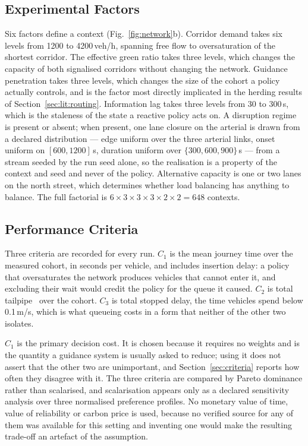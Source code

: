 \subsection{Experimental Factors}
\label{sec:method:fac}

Six factors define a context (Fig.~\ref{fig:network}b). Corridor demand takes
six levels from 1200 to 4200\,veh/h, spanning free flow to oversaturation of the
shortest corridor. The effective green ratio takes three levels, which changes
the capacity of both signalised corridors without changing the network. Guidance
penetration takes three levels, which changes the size of the cohort a policy
actually controls, and is the factor most directly implicated in the
herding results of Section~\ref{sec:lit:routing}. Information lag takes three
levels from 30 to 300\,s, which is the staleness of the state a reactive policy
acts on. A disruption regime is present or absent; when present, one lane closure
on the arterial is drawn from a declared distribution --- edge uniform over the
three arterial links, onset uniform on $[600,1200]$\,s, duration uniform over
$\{300,600,900\}$\,s --- from a stream seeded by the run seed alone, so the
realisation is a property of the context and seed and never of the policy.
Alternative capacity is one or two lanes on the north street, which determines
whether load balancing has anything to balance. The full factorial is
$6\times3\times3\times3\times2\times2 = 648$ contexts.

\subsection{Performance Criteria}
\label{sec:method:crit}

Three criteria are recorded for every run. $C_1$ is the mean journey time over
the measured cohort, in seconds per vehicle, and includes insertion delay: a
policy that oversaturates the network produces vehicles that cannot enter it, and
excluding their wait would credit the policy for the queue it caused. $C_2$ is
total tailpipe \CO\ over the cohort. $C_3$ is total stopped delay, the time
vehicles spend below 0.1\,m/s, which is what queueing costs in a form that
neither of the other two isolates.

$C_1$ is the primary decision cost. It is chosen because it requires no weights
and is the quantity a guidance system is usually asked to reduce; using it does
not assert that the other two are unimportant, and Section~\ref{sec:criteria}
reports how often they disagree with it. The three criteria are compared by
Pareto dominance rather than scalarised, and scalarisation appears only as a
declared sensitivity analysis over three normalised preference profiles. No
monetary value of time, value of reliability or carbon price is used, because no
verified source for any of them was available for this setting and inventing one
would make the resulting trade-off an artefact of the assumption.

